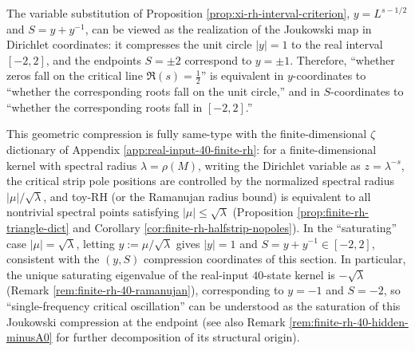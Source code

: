 \begin{remark}\label{rem:xi-joukowski-toy-rh-alignment}
The variable substitution of Proposition \ref{prop:xi-rh-interval-criterion},
\(
y=L^{s-1/2}
\)
and
\(
S=y+y^{-1}
\),
can be viewed as the realization of the Joukowski map in Dirichlet coordinates: it compresses the unit circle \(|y|=1\) to the real interval \([-2,2]\), and the endpoints
\(
S=\pm 2
\)
correspond to
\(
y=\pm 1
\).
Therefore, ``whether zeros fall on the critical line \(\Re(s)=\tfrac12\)'' is equivalent in \(y\)-coordinates to ``whether the corresponding roots fall on the unit circle,'' and in \(S\)-coordinates to ``whether the corresponding roots fall in \([-2,2]\).''
\par
This geometric compression is fully same-type with the finite-dimensional \(\zeta\) dictionary of Appendix \ref{app:real-input-40-finite-rh}: for a finite-dimensional kernel with spectral radius \(\lambda=\rho(M)\),
writing the Dirichlet variable as \(z=\lambda^{-s}\), the critical strip pole positions are controlled by the normalized spectral radius
\(
|\mu|/\sqrt{\lambda}
\),
and toy-RH (or the Ramanujan radius bound) is equivalent to all nontrivial spectral points satisfying \(|\mu|\le \sqrt{\lambda}\) (Proposition \ref{prop:finite-rh-triangle-dict} and Corollary \ref{cor:finite-rh-halfstrip-nopoles}).
In the ``saturating'' case \(|\mu|=\sqrt{\lambda}\), letting
\(
y:=\mu/\sqrt{\lambda}
\)
gives \(|y|=1\) and \(S=y+y^{-1}\in[-2,2]\), consistent with the \((y,S)\) compression coordinates of this section.
In particular, the unique saturating eigenvalue of the real-input \(40\)-state kernel is \(-\sqrt{\lambda}\) (Remark \ref{rem:finite-rh-40-ramanujan}), corresponding to \(y=-1\) and \(S=-2\), so ``single-frequency critical oscillation'' can be understood as the saturation of this Joukowski compression at the endpoint (see also Remark \ref{rem:finite-rh-40-hidden-minusA0} for further decomposition of its structural origin).
\end{remark}
